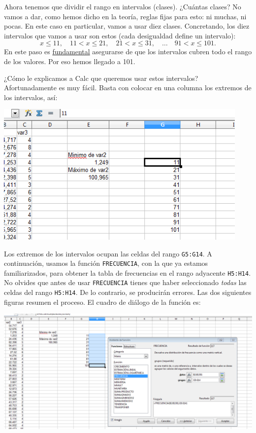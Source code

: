 \documentclass[10pt,a4paper]{article}\usepackage[]{graphicx}\usepackage[]{color}
\newcounter {cont01}
\begin{document}
Ahora tenemos que dividir el rango en intervalos (clases). ¿Cuántas clases? No vamos a dar, como hemos dicho en la teoría, reglas fijas para esto: ni muchas, ni pocas.  En este caso en particular, vamos a usar diez clases. Concretando, los diez intervalos que vamos a usar son estos (cada desigualdad define un intervalo):
\[x \leq 11,\quad 11 < x \leq 21,\quad 21 < x \leq 31,\quad \ldots \quad 91 < x \leq 101.\]
En este paso es \underline{fundamental} asegurarse de que los intervalos cubren todo el rango de los valores. Por eso hemos llegado a 101.

¿Cómo le explicamos a Calc que queremos usar estos intervalos? Afortunadamente es muy fácil. Basta con colocar en una columna los extremos de los intervalos, así:
    \begin{center}
    \includegraphics[height=7cm]{../fig/Tut02-30.png}
    \end{center}
Los extremos de los intervalos ocupan las celdas del rango {\tt G5:G14}. A continuación, usamos la función {\tt FRECUENCIA}, con la que ya estamos familiarizados, para obtener la tabla de frecuencias en el rango adyacente {\tt H5:H14}. No olvides que antes de usar {\tt FRECUENCIA} tienes que haber seleccionado {\em todas} las celdas del rango {\tt H5:H14}. De lo contrario, se producirán errores. Las dos siguientes figuras resumen el proceso. El cuadro de diálogo de la función es:
    \begin{center}
    \includegraphics[width=15cm]{../fig/Tut02-31.png}
    \end{center}
\end{document}
